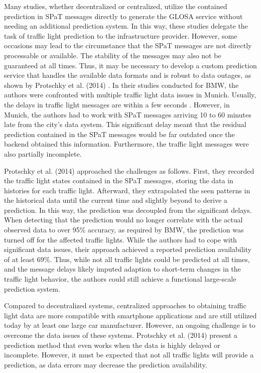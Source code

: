 Many studies, whether decentralized or centralized, utilize the contained prediction in SPaT messages directly to generate the GLOSA service without needing an additional prediction system. In this way, these studies delegate the task of traffic light prediction to the infrastructure provider. However, some occasions may lead to the circumstance that the SPaT messages are not directly processable or available. The stability of the messages may also not be guaranteed at all times. Thus, it may be necessary to develop a custom prediction service that handles the available data formats and is robust to data outages, as shown by Protschky et al. (2014) \cite{protschky_extensive_2014, protschky_adaptive_2014}. In their studies conducted for BMW, the authors were confronted with multiple traffic light data issues in Munich. Usually, the delays in traffic light messages are within a few seconds \cite{neuner_leitfaden_2020}. However, in Munich, the authors had to work with SPaT messages arriving 10 to 60 minutes late from the city's data system. This significant delay meant that the residual prediction contained in the SPaT messages would be far outdated once the backend obtained this information. Furthermore, the traffic light messages were also partially incomplete.

Protschky et al. (2014) \cite{protschky_extensive_2014, protschky_adaptive_2014} approached the challenges as follows. First, they recorded the traffic light states contained in the SPaT messages, storing the data in histories for each traffic light. Afterward, they extrapolated the seen patterns in the historical data until the current time and slightly beyond to derive a prediction. In this way, the prediction was decoupled from the significant delays. When detecting that the prediction would no longer correlate with the actual observed data to over 95\% accuracy, as required by BMW, the prediction was turned off for the affected traffic lights. While the authors had to cope with significant data issues, their approach achieved a reported prediction availability of at least 69\%. Thus, while not all traffic lights could be predicted at all times, and the message delays likely imputed adaption to short-term changes in the traffic light behavior, the authors could still achieve a functional large-scale prediction system.

Compared to decentralized systems, centralized approaches to obtaining traffic light data are more compatible with smartphone applications and are still utilized today by at least one large car manufacturer. However, an ongoing challenge is to overcome the data issues of these systems. Protschky et al. (2014) \cite{protschky_extensive_2014, protschky_adaptive_2014} present a prediction method that even works when the data is highly delayed or incomplete. However, it must be expected that not all traffic lights will provide a prediction, as data errors may decrease the prediction availability.

